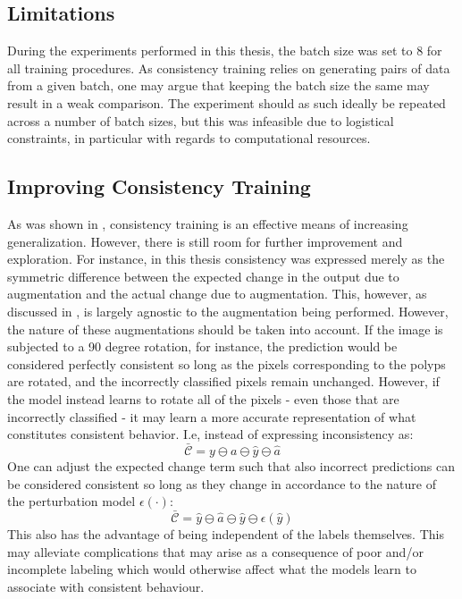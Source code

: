 \subsection{Limitations}
    During the experiments performed in this thesis, the batch size was set to 8 for all training procedures. As consistency training relies on generating pairs of data from a given batch, one may argue that keeping the batch size the same may result in a weak comparison. The experiment should as such ideally be repeated across a number of batch sizes, but this was infeasible due to logistical constraints, in particular with regards to computational resources. 

    \subsection{Improving Consistency Training} \label{new_closs}
    As was shown in , consistency training is an effective means of increasing generalization. However, there is still room for further improvement and exploration. For instance, in this thesis consistency was expressed merely as the symmetric difference between the expected change in the output due to augmentation and the actual change due to augmentation. This, however, as discussed in , is largely agnostic to the augmentation being performed. However, the nature of these augmentations should be taken into account. If the image is subjected to a 90 degree rotation, for instance, the prediction would be considered perfectly consistent so long as the pixels corresponding to the polyps are rotated, and the incorrectly classified pixels remain unchanged. However, if the model instead learns to rotate all of the pixels - even those that are incorrectly classified - it may learn a more accurate representation of what constitutes consistent behavior. I.e, instead of expressing inconsistency as:
    \begin{equation*}
        \bar{\mathcal{C}} = y\ominus a \ominus \hat{y} \ominus \hat{a}  
    \end{equation*}
    One can adjust the expected change term such that also incorrect predictions can be considered consistent so long as they change in accordance to the nature of the perturbation model \(\epsilon(\cdot)\):
        \begin{equation*}
        \bar{\mathcal{C}} = \hat{y}\ominus \hat{a} \ominus \hat{y}\ominus \epsilon(\hat{y})  
    \end{equation*}
    This also has the advantage of being independent of the labels themselves. This may alleviate complications that may arise as a consequence of poor and/or incomplete labeling which would otherwise affect what the models learn to associate with consistent behaviour. 


